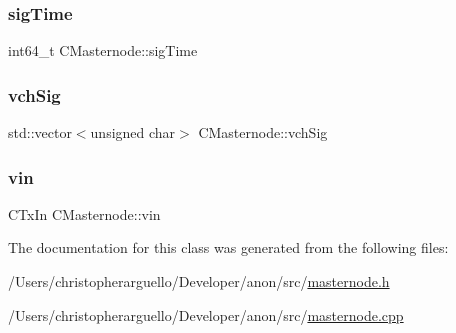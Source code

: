 \mbox{\label{class_c_masternode_a89fca1a40dbccbe67b173d76fac399ea}} 
\subsubsection{\texorpdfstring{sig\+Time}{sigTime}}
{\footnotesize\ttfamily int64\+\_\+t C\+Masternode\+::sig\+Time}

\mbox{\label{class_c_masternode_a880d00984546ced35c26924d5d80dedc}} 
\subsubsection{\texorpdfstring{vch\+Sig}{vchSig}}
{\footnotesize\ttfamily std\+::vector$<$unsigned char$>$ C\+Masternode\+::vch\+Sig}

\mbox{\label{class_c_masternode_a485b26778bb8b006152aaa64168afe6b}} 
\subsubsection{\texorpdfstring{vin}{vin}}
{\footnotesize\ttfamily C\+Tx\+In C\+Masternode\+::vin}



The documentation for this class was generated from the following files\+:\begin{DoxyCompactItemize}
\item 
/\+Users/christopherarguello/\+Developer/anon/src/\mbox{\hyperlink{masternode_8h}{masternode.\+h}}\item 
/\+Users/christopherarguello/\+Developer/anon/src/\mbox{\hyperlink{masternode_8cpp}{masternode.\+cpp}}\end{DoxyCompactItemize}
